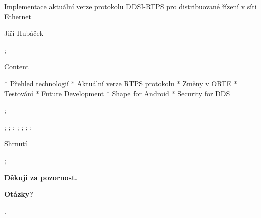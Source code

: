 

\worktype[M/CZ]

\slideshow

\tit Implementace aktuální verze protokolu DDSI-RTPS pro distribuované řízení v síti Ethernet

\subtit Jiří Hubáček

\pg;


\sec Content

* Přehled technologií
* Aktuální verze RTPS protokolu
* Změny v ORTE
* Testování
* Future Development
* Shape for Android
* Security for DDS

\pg;

 \pg;
 \pg;
 \pg;
 \pg;
 \pg;
 \pg;
 \pg;


\sec Shrnutí

\pg;

\null
\vskip2cm
\centerline{\typosize[35/40]\bf Děkuji za pozornost.}

\vskip2cm
\centerline{\Blue\typosize[60/70]\bf Otázky?}

\pg.
